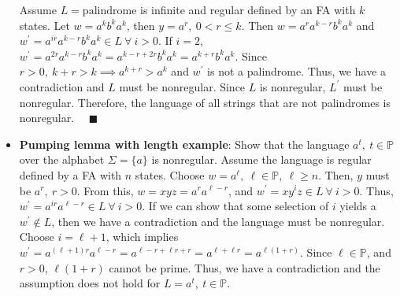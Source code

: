 \documentclass{report}
\begin{document}
\begin{itemize}
    \bigbreak \noindent 
    Assume $L = \text{palindrome}$ is infinite and regular defined by an FA with $k$ states.
    \bigbreak \noindent 
    Let $w=a^{k}b^{k}a^{k}$, then $y=a^{r}, \ 0 < r \leq k$. Then $w = a^{r}a^{k-r}b^{k}a^{k}$ and $w^{\prime} = a^{ir}a^{k-r}b^{k}a^{k} \in L \ \forall \ i>0$. If $i=2$, $w^{\prime} = a^{2r}a^{k-r}b^{k}a^{k} = a^{k-r+2r}b^{k}a^{k} = a^{k + r}b^{k}a^{k}$. Since $r >0,\ k  + r > k \implies a^{k+r} > a^{k}$ and $w^{\prime}$ is not a palindrome. Thus, we have a contradiction  and $L$ must be nonregular. Since $L$ is nonregular, $L^{\prime}$ must be nonregular. Therefore, the language of all strings that are not palindromes is nonregular. $\quad \blacksquare$
\item \textbf{Pumping lemma with length example}: Show that the language $a^{t},\ t \in \mathbb{P}$ over the alphabet $\Sigma = \{a\}$ is nonregular.
    \bigbreak \noindent 
    Assume the language is regular defined by a FA with $n$ states. Choose $w=a^{\ell},\ \ell \in \mathbb{P},\ \ell \geq n$. Then, $y$ must be $a^{r},\ r>0$. From this, $w = xyz = a^{r}a^{\ell - r}$, and $w^{\prime} = xy^{i}z \in L \ \forall \ i > 0$. Thus, $w^{\prime} = a^{ir}a^{\ell - r} \in L \ \forall \ i > 0$. If we can show that some selection of $i$ yields a $w^{\prime} \not\in L$, then we have a contradiction and the language must be nonregular.
    \bigbreak \noindent 
    Choose $i = \ell  + 1$, which implies $w^{\prime} = a^{(\ell + 1)r}a^{\ell -r} = a^{\ell -r  + \ell r + r }  = a^{\ell + \ell r} = a^{\ell (1 + r)}$. Since $\ell \in \mathbb{P}$, and $r>0$, $\ell (1 + r)$ cannot be prime. Thus, we have a contradiction and the assumption does not hold for $L = a^{t},\ t\in \mathbb{P}$.
    \end{itemize}

    \pagebreak 
\end{document}
